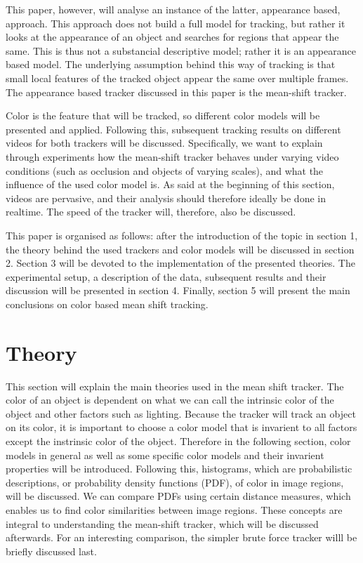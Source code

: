 \documentclass[a4paper,11pt]{article}
\begin{document}
This paper, however, will analyse an instance of the latter, appearance based, approach. This approach does not build a full model for tracking, but rather it looks at the appearance of an object and searches for regions that appear the same.  This is thus not a substancial descriptive model; rather it is an appearance based model. The underlying assumption behind this way of tracking is that small local features of the tracked object appear the same over multiple frames. %
The appearance based tracker discussed in this paper is the mean-shift tracker. 

Color is the feature that will be tracked, so different color models will be presented and applied. Following this, subsequent tracking results on different videos for both trackers will be discussed. Specifically, we want to explain through experiments how the mean-shift tracker behaves under varying video conditions (such as occlusion and objects of varying scales), and what the influence of the used color model is.
	As said at the beginning of this section, videos are pervasive, and their analysis should therefore ideally be done in realtime. The speed of the tracker will, therefore, also be discussed. 

	This paper is organised as follows:  after the introduction of the topic in section 1, the theory behind the used trackers and color models will be discussed in section 2.
	Section 3 will be devoted to the implementation of the presented theories. The experimental setup, a description of the data, subsequent results and their discussion will be presented in section 4. 
	Finally, section 5 will present the main conclusions on color based mean shift tracking.




\section{Theory}	

	This section will explain the main theories used in the mean shift tracker. The color of an object is dependent on what we can call the intrinsic color of the object and other factors such as lighting. Because the tracker will track an object on its color, it is important to choose a color model that is invarient to all factors except the instrinsic color of the object. Therefore in the following section, color models in general as well as some specific color models and their invarient properties will be introduced. Following this, histograms, which are probabilistic descriptions, or probability density functions (PDF), of color in image regions, will be discussed. We can compare PDFs using certain distance measures, which enables us to find color similarities between image regions. These concepts are integral to understanding the mean-shift tracker, which will be discussed afterwards. For an interesting comparison, the simpler brute force tracker willl be briefly discussed last.  
\end{document}
